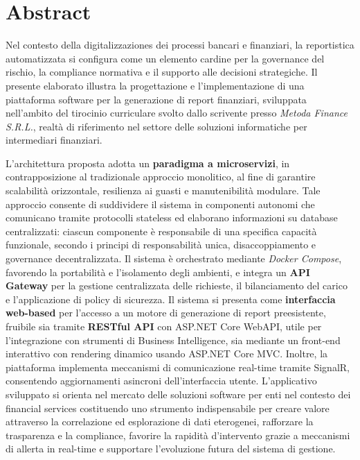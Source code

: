 \chapter*{Abstract}
Nel contesto della digitalizzaziones dei processi bancari e finanziari, la reportistica automatizzata si configura come un elemento cardine per la governance del rischio, la compliance normativa e il supporto alle decisioni strategiche. Il presente elaborato illustra la progettazione e l’implementazione di una piattaforma software per la generazione di report finanziari, sviluppata nell’ambito del tirocinio curriculare svolto dallo scrivente presso \emph{Metoda Finance S.R.L.}, realtà di riferimento nel settore delle soluzioni informatiche per intermediari finanziari.

L’architettura proposta adotta un \textbf{paradigma a microservizi}, in contrapposizione al tradizionale approccio monolitico, al fine di garantire scalabilità orizzontale, resilienza ai guasti e manutenibilità modulare. Tale approccio consente di suddividere il sistema in componenti autonomi che comunicano tramite protocolli stateless ed elaborano informazioni su database centralizzati: ciascun componente è responsabile di una specifica capacità funzionale, secondo i principi di responsabilità unica, disaccoppiamento e governance decentralizzata. Il sistema è orchestrato mediante \emph{Docker Compose}, favorendo la portabilità e l'isolamento degli ambienti, e integra un \textbf{API Gateway} per la gestione centralizzata delle richieste, il bilanciamento del carico e l’applicazione di policy di sicurezza.
Il sistema si presenta come \textbf{interfaccia web-based} per l’accesso a un motore di generazione di report preesistente, fruibile sia tramite \textbf{RESTful API} con ASP.NET Core WebAPI, utile per l’integrazione con strumenti di Business Intelligence, sia mediante un front-end interattivo con rendering dinamico usando ASP.NET Core MVC. Inoltre, la piattaforma implementa meccanismi di comunicazione real-time tramite SignalR, consentendo aggiornamenti asincroni dell'interfaccia utente.
L'applicativo sviluppato si orienta nel mercato delle soluzioni software per enti nel contesto dei financial services costituendo uno strumento indispensabile per creare valore attraverso la correlazione ed esplorazione di dati eterogenei, rafforzare la trasparenza e la compliance, favorire la rapidità d'intervento grazie a meccanismi di allerta in real-time e supportare l’evoluzione futura del sistema di gestione.